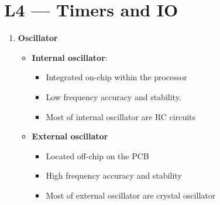 \documentclass[a4paper]{article}
\begin{document}
\section*{L4 --- Timers and IO}
  \begin{enumerate}[label = \arabic*.]
    \item \textbf{Oscillator}
      \begin{itemize}[leftmargin = 1cm]
        \item \textbf{Internal oscillator}:
          \begin{itemize}[leftmargin = 1cm]
            \item Integrated on-chip within the processor
            \item Low frequency accuracy and stability.
            \item Most of internal oscillator are RC circuits
          \end{itemize}
        \item \textbf{External oscillator}
          \begin{itemize}[leftmargin = 1cm]
            \item Located off-chip on the PCB
            \item High frequency accuracy and stability
            \item Most of external oscillator are crystal oscillator
          \end{itemize}
      \end{itemize}


\end{enumerate}
\end{document}
